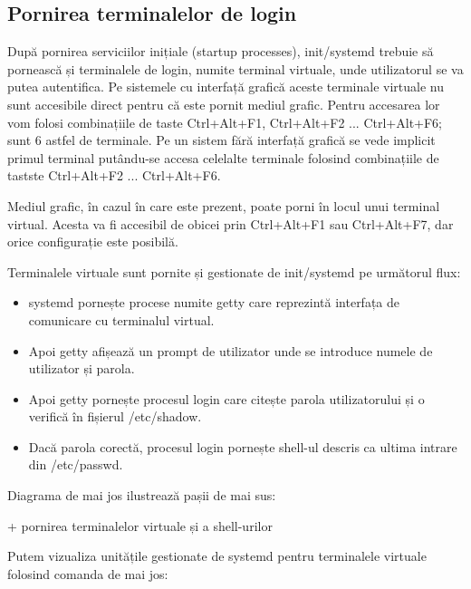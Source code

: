 \subsection{Pornirea terminalelor de login}
\label{sec:boot-init-linux-login}

După pornirea serviciilor inițiale (startup processes), init/systemd trebuie să
pornească și terminalele de login, numite terminal virtuale, unde utilizatorul
se va putea autentifica. Pe sistemele cu interfață grafică aceste terminale
virtuale nu sunt accesibile direct pentru că este pornit mediul grafic. Pentru
accesarea lor vom folosi combinațiile de taste Ctrl+Alt+F1, Ctrl+Alt+F2 ...
Ctrl+Alt+F6; sunt 6 astfel de terminale. Pe un sistem fără interfață grafică se
vede implicit primul terminal putându-se accesa celelalte terminale folosind
combinațiile de tastste Ctrl+Alt+F2 ... Ctrl+Alt+F6.

Mediul grafic, în cazul în care este prezent, poate porni în locul unui terminal
virtual. Acesta va fi accesibil de obicei prin Ctrl+Alt+F1 sau Ctrl+Alt+F7, dar
orice configurație este posibilă.

Terminalele virtuale sunt pornite și gestionate de init/systemd pe următorul flux:

\begin{itemize}
	\item systemd pornește procese numite getty care reprezintă interfața de
		comunicare cu terminalul virtual.
	\item Apoi getty afișează un prompt de utilizator unde se introduce
		numele de utilizator și parola.
	\item Apoi getty pornește procesul login care citește parola
		utilizatorului și o verifică în fișierul /etc/shadow.
	\item Dacă parola corectă, procesul login pornește shell-ul descris ca
		ultima intrare din /etc/passwd.
\end{itemize}

Diagrama de mai jos ilustrează pașii de mai sus:

+ pornirea terminalelor virtuale și a shell-urilor

Putem vizualiza unitățile gestionate de systemd pentru terminalele virtuale folosind comanda de mai jos:

